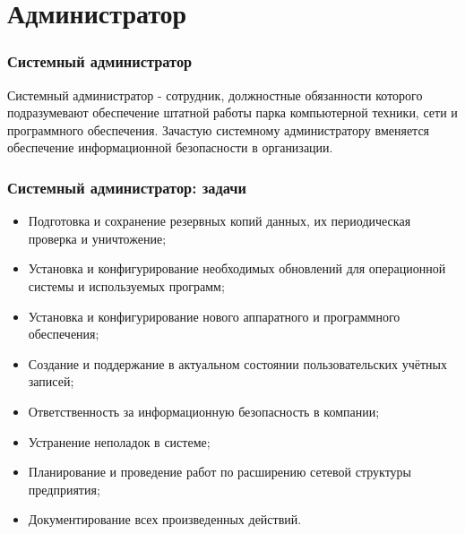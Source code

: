 \documentclass{../industrial-development}
\begin{document}
	
	\section{Администратор} 
	
	\begin{frame} \frametitle{Системный администратор}
		\begin{block}{}
			\alert {Системный администратор} - сотрудник, должностные обязанности которого подразумевают обеспечение штатной работы парка компьютерной техники, сети и программного обеспечения. Зачастую системному администратору вменяется обеспечение информационной безопасности в организации.
		\end{block}
	\end{frame}

	\begin{frame} \frametitle{Системный администратор: задачи}
		\begin{itemize}
			\item Подготовка и сохранение резервных копий данных, их периодическая проверка и уничтожение;
			\item Установка и конфигурирование необходимых обновлений для операционной системы и используемых программ;
			\item Установка и конфигурирование нового аппаратного и программного обеспечения;
			\item Создание и поддержание в актуальном состоянии пользовательских учётных записей;
			\item Ответственность за информационную безопасность в компании;
			\item Устранение неполадок в системе;
			\item Планирование и проведение работ по расширению сетевой структуры предприятия;
			\item Документирование всех произведенных действий.
		\end{itemize}
	\end{frame}
	
\end{document}
